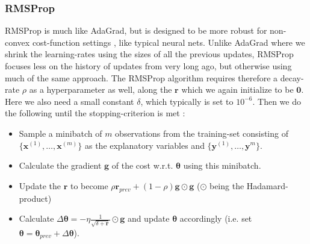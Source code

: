 \documentclass{article}
\begin{document}
\subsubsection{RMSProp}
RMSProp is much like AdaGrad, but is designed to be more robust for
non-convex cost-function settings \cite[s.~8.5.2]{goodfellow2016deep}, like
typical neural nets. Unlike AdaGrad where we shrink the learning-rates using the
sizes of all the previous updates, RMSProp focuses less on the history of
updates from very long ago, but otherwise using much of the same approach. The
RMSProp algorithm requires therefore a decay-rate $\rho$ as a hyperparameter as
well, along the $\bm{r}$ which we again initialize to be $\bm{0}$. Here we also need a
small constant $\delta$, which typically is set to $10^{-6}$. Then we do the
following until the stopping-criterion is met \cite[algorithm~8.5]{goodfellow2016deep}:
\begin{itemize}
      \item Sample a minibatch of $m$ observations from the training-set
            consisting of $\{\bm{x}^{(1)}, \dots, \bm{x}^{(m)}\}$ as the explanatory
            variables and $\{\bm{y}^{(1)}, \dots, \bm{y}^{m}\}$.
      \item Calculate the gradient $\bm{g}$ of the cost w.r.t. $\bm{\theta}$ using
            this minibatch.
      \item Update the $\bm{r}$ to become $\rho \bm{r}_{prev} + (1 - \rho) \bm{g} \odot \bm{g}$
            ($\odot$ being the Hadamard-product)
      \item Calculate $\Delta \bm{\theta} = -\eta \frac{1}{\sqrt{\delta + \bm{r}}}
                  \odot \bm{g}$ and update $\bm{\theta}$ accordingly (i.e. set $\bm{\theta} =
                  \bm{\theta}_{prev} + \Delta \bm{\theta}$).
\end{itemize}
\end{document}
